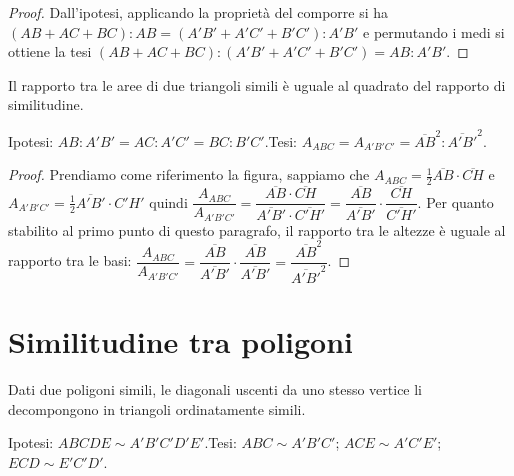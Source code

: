 \begin{proof}
Dall'ipotesi, applicando la proprietà del comporre si ha 
$(AB+AC+BC):AB=(A'B'+A'C'+B'C'):A'B'$ e permutando i medi si ottiene 
la tesi $(AB+AC+BC):(A'B'+A'C'+B'C')=AB:A'B'$.
\end{proof}

\begin{teorema}\label{teo:6.4}%
Il rapporto tra le aree\footnotemark{} di due triangoli simili è 
uguale al quadrato del rapporto di similitudine.
\end{teorema}


\noindent Ipotesi: $AB:A'B'=AC:A'C'=BC:B'C'$.\tab Tesi: 
$A_{ABC}=A_{A'B'C'}=\overline{AB}^2:\overline{A'B'}^2$.

\begin{figure*}[!htb]
	\centering
\end{figure*}

\begin{proof}
Prendiamo come riferimento la figura, sappiamo che 
$A_{ABC}=\frac{1}{2}\overline{AB}\cdot\overline{CH}$ e 
$A_{A'B'C'}=\frac{1}{2}\overline{A'B'}\cdot{C'H'}$ quindi 
$\dfrac{A_{ABC}}{A_{A'B'C'}} = 
\dfrac{\overline{AB}\cdot\overline{CH}}{\overline{A'B'}\cdot\overline{
C'H'}} = \dfrac{\overline{AB}}{\overline{A'B'}}\cdot 
\dfrac{\overline{CH}}{\overline{C'H'}}$.
Per quanto stabilito al primo punto di questo paragrafo, il rapporto 
tra le altezze è uguale al rapporto tra le basi: 
$\dfrac{A_{ABC}}{A_{A'B'C'}} = 
\dfrac{\overline{AB}}{\overline{A'B'}}\cdot 
\dfrac{\overline{AB}}{\overline{A'B'}} = 
\dfrac{\overline{AB}^2}{\overline{A'B'}^2}$.
\end{proof}


\section{Similitudine tra poligoni}\label{sect:similitudine_poligoni}

\begin{teorema}
Dati due poligoni simili, le diagonali uscenti da uno stesso vertice 
li decompongono in triangoli ordinatamente simili.
\end{teorema}

\noindent Ipotesi: $ABCDE\sim A'B'C'D'E'$.\tab Tesi: $ABC\sim 
A'B'C'$; $ACE\sim A'C'E'$; $ECD\sim E'C'D'$.

